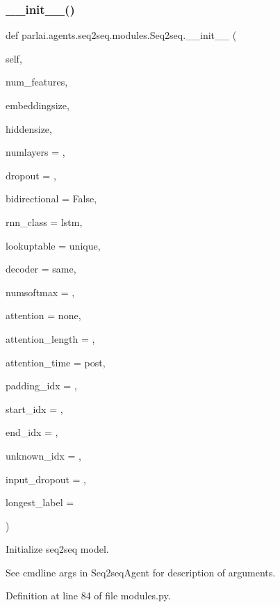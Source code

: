 \subsubsection{\texorpdfstring{\+\_\+\+\_\+init\+\_\+\+\_\+()}{\_\_init\_\_()}}
{\footnotesize\ttfamily def parlai.\+agents.\+seq2seq.\+modules.\+Seq2seq.\+\_\+\+\_\+init\+\_\+\+\_\+ (\begin{DoxyParamCaption}\item[{}]{self,  }\item[{}]{num\+\_\+features,  }\item[{}]{embeddingsize,  }\item[{}]{hiddensize,  }\item[{}]{numlayers = {},  }\item[{}]{dropout = {},  }\item[{}]{bidirectional = {\ttfamily False},  }\item[{}]{rnn\+\_\+class = {\ttfamily \textquotesingle{}lstm\textquotesingle{}},  }\item[{}]{lookuptable = {\ttfamily \textquotesingle{}unique\textquotesingle{}},  }\item[{}]{decoder = {\ttfamily \textquotesingle{}same\textquotesingle{}},  }\item[{}]{numsoftmax = {},  }\item[{}]{attention = {\ttfamily \textquotesingle{}none\textquotesingle{}},  }\item[{}]{attention\+\_\+length = {},  }\item[{}]{attention\+\_\+time = {\ttfamily \textquotesingle{}post\textquotesingle{}},  }\item[{}]{padding\+\_\+idx = {},  }\item[{}]{start\+\_\+idx = {},  }\item[{}]{end\+\_\+idx = {},  }\item[{}]{unknown\+\_\+idx = {},  }\item[{}]{input\+\_\+dropout = {},  }\item[{}]{longest\+\_\+label = {} }\end{DoxyParamCaption})}

\begin{DoxyVerb}Initialize seq2seq model.

See cmdline args in Seq2seqAgent for description of arguments.
\end{DoxyVerb}
 

Definition at line 84 of file modules.\+py.




